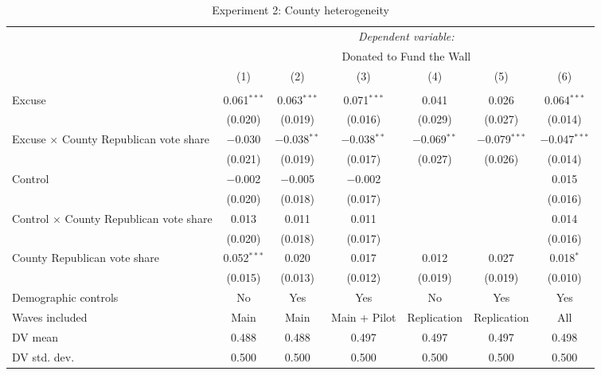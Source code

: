 
\begin{table}[!htbp] \centering 
  \caption{Experiment 2: County heterogeneity} 
  \label{t:2-cityheterogeneity} 
\begin{threeparttable}
\begin{tabular}{@{\hspace{5pt}}l@{\hspace{5pt}}cccccc} 
\toprule 
 & \multicolumn{6}{c}{\textit{Dependent variable:}} \\ 
\cmidrule(rr){2-7} 
 & \multicolumn{6}{c}{Donated to Fund the Wall} \\ 
 \cmidrule(rr){2-7}
 & (1) & (2) & (3) & (4) & (5) & (6)\\ 
\midrule  
\\[-2.1ex] Excuse & 0.061$^{***}$ & 0.063$^{***}$ & 0.071$^{***}$ & 0.041 & 0.026 & 0.064$^{***}$ \\ 
  & (0.020) & (0.019) & (0.016) & (0.029) & (0.027) & (0.014) \\ 
 \addlinespace 
 Excuse $\times$ County Republican vote share & $-$0.030 & $-$0.038$^{**}$ & $-$0.038$^{**}$ & $-$0.069$^{**}$ & $-$0.079$^{***}$ & $-$0.047$^{***}$ \\ 
  & (0.021) & (0.019) & (0.017) & (0.027) & (0.026) & (0.014) \\ 
 \addlinespace 
 Control & $-$0.002 & $-$0.005 & $-$0.002 &  &  & 0.015 \\ 
  & (0.020) & (0.018) & (0.017) &  &  & (0.016) \\ 
 \addlinespace 
 Control $\times$ County Republican vote share & 0.013 & 0.011 & 0.011 &  &  & 0.014 \\ 
  & (0.020) & (0.018) & (0.017) &  &  & (0.016) \\ 
 \addlinespace 
 County Republican vote share & 0.052$^{***}$ & 0.020 & 0.017 & 0.012 & 0.027 & 0.018$^{*}$ \\ 
  & (0.015) & (0.013) & (0.012) & (0.019) & (0.019) & (0.010) \\ 
 \addlinespace 
\midrule  
Demographic controls & No & Yes & Yes & No & Yes & Yes \\ 
Waves included & Main & Main & Main + Pilot & Replication & Replication & All \\ 
\midrule
DV mean & 0.488 & 0.488 & 0.497 & 0.497 & 0.497 & 0.498 \\
DV std. dev. & 0.500 & 0.500 & 0.500 & 0.500 & 0.500 & 0.500 \\

\end{tabular}
\end{threeparttable}
\end{table}
